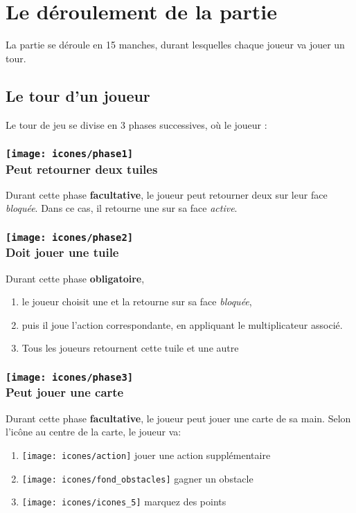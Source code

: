 \section*{Le déroulement de la partie} \label{sec:tourDeJeu}
La partie se déroule en 15 manches, durant lesquelles chaque joueur va jouer un tour.

\subsection*{Le tour d'un joueur} \label{sec:tourDeJoueur}
Le tour de jeu se divise en 3 phases successives, où le joueur :
\subsubsection*{\texttt{[image: icones/phase1]} \\ Peut retourner deux tuiles}
Durant cette phase \textbf{facultative}, le joueur peut retourner deux \tuilesActives sur leur face \textit{bloquée}. Dans ce cas, il retourne une \tuileBloquee sur sa face \textit{active}.

\subsubsection*{\texttt{[image: icones/phase2]} \\ Doit jouer une tuile}
Durant cette phase \textbf{obligatoire},
\begin{enumerate}
\item le joueur choisit une \tuileActive et la retourne sur sa face \textit{bloquée},
\item puis il joue l'action correspondante, en appliquant le multiplicateur associé.
\item Tous les joueurs retournent cette tuile et une autre
\end{enumerate}

\subsubsection*{\texttt{[image: icones/phase3]} \\ Peut jouer une carte}
Durant cette phase \textbf{facultative}, le joueur peut jouer une carte de sa main. Selon l'icône au centre de la carte, le joueur va:
\begin{enumerate}
\item \texttt{[image: icones/action]} jouer une action supplémentaire
\item \texttt{[image: icones/fond\_obstacles]} gagner un obstacle
\item \texttt{[image: icones/icones\_5]} marquez des points
\end{enumerate}

